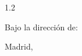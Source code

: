 \begin{titlepage}
\begin{center}
\vspace{6mm}

\begin{spacing}{1.2}
    {\large Bajo la direcci\'on de:\par}
    \vspace{2mm}
    {\large \supervisor\par}
    \if\relax\detokenize\expandafter{\cosupervisor}\relax
    \else
        \vspace{1mm}
        {\large \cosupervisor\par}
    \fi
\end{spacing}

\vfill

{\large Madrid, \thesisDate\par}
\end{center}

\end{titlepage}
